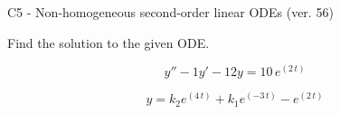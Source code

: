 \begin{exercise}
  \begin{exerciseTitle}C5 - Non-homogeneous second-order linear ODEs (ver. 56)\end{exerciseTitle}
  \begin{exerciseStatement}
    
Find the solution to the given ODE.

    
\[y''-1y'-12y = 10 \, e^{\left(2 \, t\right)}\]

  \end{exerciseStatement}
  \begin{exerciseAnswer}
    
\[y= k_{2} e^{\left(4 \, t\right)} + k_{1} e^{\left(-3 \, t\right)} - e^{\left(2 \, t\right)}\]

  \end{exerciseAnswer}
\end{exercise}